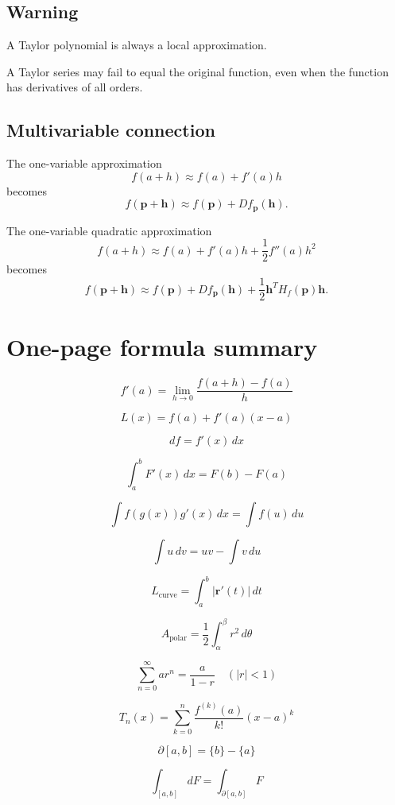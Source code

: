 \subsection*{Warning}

A Taylor polynomial is always a local approximation.

A Taylor series may fail to equal the original function, even when the function has
derivatives of all orders.

\subsection*{Multivariable connection}

The one-variable approximation
\[
    f(a+h)\approx f(a)+f'(a)h
\]
becomes
\[
    f(\mathbf p+\mathbf h)
    \approx
    f(\mathbf p)+Df_{\mathbf p}(\mathbf h).
\]

The one-variable quadratic approximation
\[
    f(a+h)\approx f(a)+f'(a)h+\frac12 f''(a)h^2
\]
becomes
\[
    f(\mathbf p+\mathbf h)
    \approx
    f(\mathbf p)
    +
    Df_{\mathbf p}(\mathbf h)
    +
    \frac12\mathbf h^T H_f(\mathbf p)\mathbf h.
\]

\section*{One-page formula summary}

\[
\boxed{
    f'(a)=\lim_{h\to0}\frac{f(a+h)-f(a)}{h}
}
\]

\[
\boxed{
    L(x)=f(a)+f'(a)(x-a)
}
\]

\[
\boxed{
    df=f'(x)\,dx
}
\]

\[
\boxed{
    \int_a^b F'(x)\,dx=F(b)-F(a)
}
\]

\[
\boxed{
    \int f(g(x))g'(x)\,dx=\int f(u)\,du
}
\]

\[
\boxed{
    \int u\,dv=uv-\int v\,du
}
\]

\[
\boxed{
    L_{\text{curve}}=\int_a^b|\mathbf r'(t)|\,dt
}
\]

\[
\boxed{
    A_{\text{polar}}=\frac12\int_\alpha^\beta r^2\,d\theta
}
\]

\[
\boxed{
    \sum_{n=0}^{\infty}ar^n=\frac{a}{1-r}
    \quad (|r|<1)
}
\]

\[
\boxed{
    T_n(x)=\sum_{k=0}^{n}\frac{f^{(k)}(a)}{k!}(x-a)^k
}
\]

\[
\boxed{
    \partial[a,b]=\{b\}-\{a\}
}
\]

\[
\boxed{
    \int_{[a,b]}dF=\int_{\partial[a,b]}F
}
\]